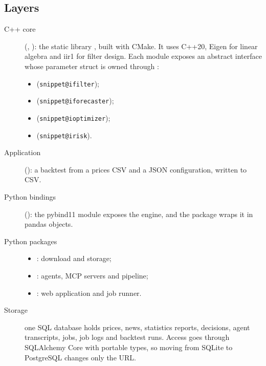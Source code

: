 \documentclass[11pt,a4paper]{article}
\makeatletter
\newcommand{\snippetsource}[1]{\csname snippet@#1\endcsname}
\newcommand{\coderef}[1]{{\footnotesize\texttt{\snippetsource{#1}}}}
\makeatother
\begin{document}
\subsection{Layers}
\begin{description}
  \item[C++ core] (, ): the static library ,
        built with CMake. It uses C++20, Eigen for linear algebra and iir1 for filter
        design. Each module exposes an abstract interface whose parameter struct is owned
        through :
        \begin{itemize}
          \item {} (\coderef{ifilter});
          \item {} (\coderef{iforecaster});
          \item {} (\coderef{ioptimizer});
          \item {} (\coderef{irisk}).
        \end{itemize}
  \item[Application]  (): a backtest from a
        prices CSV and a JSON configuration, written to CSV.
  \item[Python bindings] (): the pybind11 module 
        exposes the engine, and the  package wraps it in pandas objects.
  \item[Python packages]
        \begin{itemize}
          \item {}: download and storage;
          \item {}: agents, MCP servers and pipeline;
          \item {}: web application and job runner.
        \end{itemize}
  \item[Storage] one SQL database holds prices, news, statistics reports, decisions, agent
        transcripts, jobs, job logs and backtest runs. Access goes through SQLAlchemy Core
        with portable types, so moving from SQLite to PostgreSQL changes only the URL.
\end{description}
\end{document}
